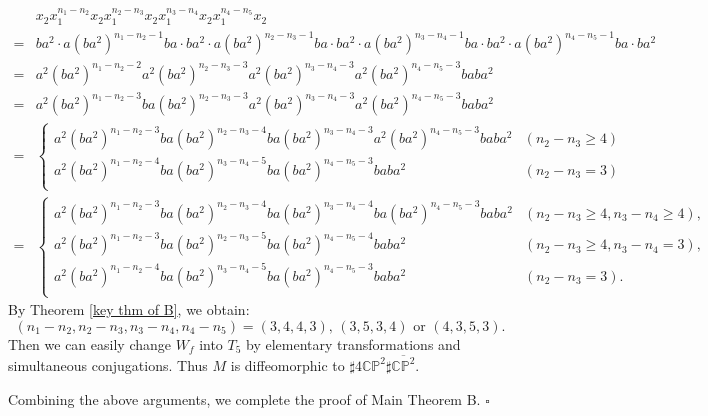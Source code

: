 \documentclass{amsart}
\theoremstyle{plain}
\theoremstyle{definition}
\begin{document}
{\allowdisplaybreaks
\begin{align*}
& x_2x_1^{n_1-n_2}x_2x_1^{n_2-n_3}x_2x_1^{n_3-n_4}x_2x_1^{n_4-n_5}x_2 \\
= & ba^2\cdot a(ba^2)^{n_1-n_2-1}ba\cdot ba^2\cdot a(ba^2)^{n_2-n_3-1}ba\cdot ba^2\cdot a(ba^2)^{n_3-n_4-1}ba\cdot ba^2\cdot a(ba^2)^{n_4-n_5-1}ba\cdot ba^2 \\
= & a^2(ba^2)^{n_1-n_2-2}a^2(ba^2)^{n_2-n_3-3}a^2(ba^2)^{n_3-n_4-3}a^2(ba^2)^{n_4-n_5-3}baba^2 \\
= & a^2(ba^2)^{n_1-n_2-3}ba(ba^2)^{n_2-n_3-3}a^2(ba^2)^{n_3-n_4-3}a^2(ba^2)^{n_4-n_5-3}baba^2 \\
= & \begin{cases}
a^2(ba^2)^{n_1-n_2-3}ba(ba^2)^{n_2-n_3-4}ba(ba^2)^{n_3-n_4-3}a^2(ba^2)^{n_4-n_5-3}baba^2 & (n_2-n_3\geq 4) \\
a^2(ba^2)^{n_1-n_2-4}ba(ba^2)^{n_3-n_4-5}ba(ba^2)^{n_4-n_5-3}baba^2  & (n_2-n_3=3) \\
\end{cases} \\
= & \begin{cases}
a^2(ba^2)^{n_1-n_2-3}ba(ba^2)^{n_2-n_3-4}ba(ba^2)^{n_3-n_4-4}ba(ba^2)^{n_4-n_5-3}baba^2 & (n_2-n_3\geq 4, n_3-n_4\geq 4), \\
a^2(ba^2)^{n_1-n_2-3}ba(ba^2)^{n_2-n_3-5}ba(ba^2)^{n_4-n_5-4}baba^2 & (n_2-n_3\geq 4, n_3-n_4=3), \\
a^2(ba^2)^{n_1-n_2-4}ba(ba^2)^{n_3-n_4-5}ba(ba^2)^{n_4-n_5-3}baba^2  & (n_2-n_3=3). \\
\end{cases}
\end{align*}
}
By Theorem \ref{key thm of B}, we obtain: 
\[
(n_1-n_2,n_2-n_3,n_3-n_4,n_4-n_5)=(3,4,4,3)\text{, }(3,5,3,4)\text{ or }(4,3,5,3). 
\]
Then we can easily change $W_f$ into $T_5$ by elementary transformations and simultaneous conjugations. 
Thus $M$ is diffeomorphic to $\sharp 4\mathbb{CP}^2\sharp\overline{\mathbb{CP}^2}$. 

\par

Combining the above arguments, we complete the proof of Main Theorem B.  \hfill $\square$
\end{document}
